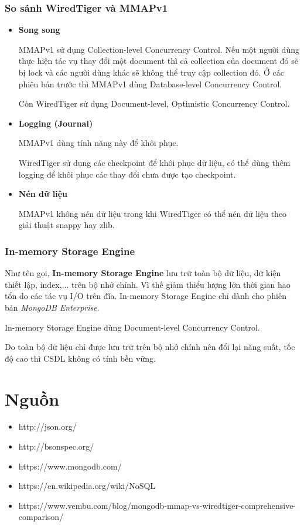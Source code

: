 \subsubsection{So sánh WiredTiger và MMAPv1}
\begin{itemize}
\item \textbf{Song song}

MMAPv1 sử dụng Collection-level Concurrency Control. Nếu một người dùng thực hiện tác vụ thay đổi một document thì cả collection của document đó sẽ bị lock và các người dùng khác sẽ không thể truy cập collection đó. Ở các phiên bản trước thì MMAPv1 dùng Database-level Concurrency Control.

Còn WiredTiger sử dụng Document-level, Optimistic Concurrency Control.
\item \textbf{Logging (Journal)}

MMAPv1 dùng tính năng này để khôi phục.

WiredTiger sử dụng các checkpoint để khôi phục dữ liệu, có thể dùng thêm logging để khôi phục các thay đổi chưa được tạo checkpoint.
\item \textbf{Nén dữ liệu}

MMAPv1 không nén dữ liệu trong khi WiredTiger có thể nén dữ liệu theo giải thuật snappy hay zlib.
\end{itemize}
\subsubsection{In-memory Storage Engine}
Như tên gọi, \textbf{In-memory Storage Engine} lưu trữ toàn bộ dữ liệu, dữ kiện thiết lập, index,... trên bộ nhớ chính. Vì thế giảm thiểu lượng lớn thời gian hao tổn do các tác vụ I/O trên đĩa. In-memory Storage Engine chỉ dành cho phiên bản \textit{MongoDB Enterprise}.

In-memory Storage Engine dùng Document-level Concurrency Control.

Do toàn bộ dữ liệu chỉ được lưu trữ trên bộ nhớ chính nên đổi lại năng suất, tốc độ cao thì CSDL không có tính bền vững.
\section{Nguồn}
\begin{itemize}
\item http://json.org/
\item http://bsonspec.org/
\item https://www.mongodb.com/
\item https://en.wikipedia.org/wiki/NoSQL
\item https://www.vembu.com/blog/mongodb-mmap-vs-wiredtiger-comprehensive-comparison/
\end{itemize}
